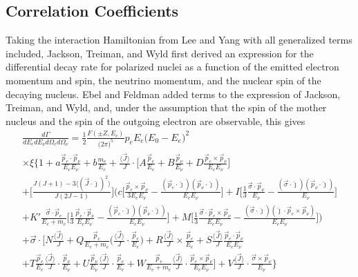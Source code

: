 \subsection{Correlation Coefficients} \label{ssec:correlations}
Taking the interaction Hamiltonian from Lee and Yang with all generalized terms included,
Jackson, Treiman, and Wyld \cite{jackson1957a,jackson1957b} first derived an expression
for the differential decay rate for polarized nuclei as a function of the emitted electron momentum
and spin, the neutrino momentum, and the nuclear spin of the decaying nucleus.
Ebel and Feldman \cite{ebel1957} added terms to the expression of Jackson, Treiman, and Wyld,
and, under the assumption that the spin of the mother nucleus and the spin of the outgoing electron
are observable, this gives
%
\begin{multline}
  \frac{d\Gamma}{dE_e dE_\nu d\Omega_e d\Omega_\nu} = \frac{1}{2} \frac{F(\pm Z, E_e)}{\big( 2\pi \big)^5}
  p_e E_e \big( E_0 - E_e \big)^2 \\ \times \xi 
  \Bigg\{ 1 + a\frac{\vec{p}_e \cdot \vec{p}_\nu}{E_e E_\nu} + b\frac{m_e}{E_e} 
  + \frac{\langle\vec{ J }\rangle}{J} \cdot \Bigg[ A\frac{\vec{p}_e}{E_e}
    + B\frac{\vec{p}_\nu}{E_\nu} + D\frac{\vec{p}_e \times \vec{p}_\nu}{E_e E_\nu}\Bigg] \\
  + \Bigg[ \frac{J(J+1)-3\langle (\vec{J} \cdot \hat{\jmath})^2 \rangle}{J(2J-1)} \Bigg]
  \Bigg( c\Bigg[ \frac{\vec{p}_e \times \vec{p}_\nu}{3E_eE_\nu} -
    \frac{(\vec{p}_e \cdot \hat{\jmath})(\vec{p}_\nu \cdot \hat{\jmath}) }{E_eE_\nu} \Bigg]
  + I \Bigg[ \frac{1}{3}\frac{\vec{\sigma} \cdot \vec{p}_\nu}{E_\nu}
    - \frac{(\vec{\sigma} \cdot \hat{\jmath})(\vec{p}_\nu \cdot \hat{\jmath})}{E_\nu} \Bigg] \\
  + K'\frac{\vec{\sigma} \cdot \vec{p}_e}{E_e+m_e} \Bigg[ \frac{1}{3}\frac{\vec{p}_e \cdot \vec{p}_\nu}{E_e E_\nu}
    - \frac{(\vec{p}_e \cdot \hat{\jmath})(\vec{p}_\nu \cdot \hat{\jmath})}{E_e E_\nu} \Bigg] 
  + M \Bigg[ \frac{1}{3}\frac{\vec{\sigma} \cdot \vec{p}_e \times \vec{p}_\nu}{E_e E_\nu}
    - \frac{(\vec{\sigma} \cdot \hat{\jmath})(\hat{\jmath} \cdot \vec{p}_e \times \vec{p}_\nu )}{E_e E_\nu} \Bigg] \Bigg) \\
  + \vec{\sigma} \cdot \Bigg[ N\frac{\langle \vec{J} \rangle}{J}
    + Q\frac{\vec{p}_e}{E_e+m_e}\Bigg(\frac{\langle \vec{J} \rangle}{J} \cdot \frac{\vec{p}_e}{E_e}\Bigg)
    + R\frac{\langle \vec{J} \rangle}{J} \times \frac{\vec{p}_e}{E_e}
    + S\frac{\langle \vec{J} \rangle}{J} \frac{\vec{p}_e\cdot \vec{p}_\nu}{E_e E_\nu} \\
    + T\frac{\vec{p}_e}{E_e}\frac{\langle \vec{J} \rangle}{J} \cdot \frac{\vec{p}_\nu}{E_\nu}
    + U\frac{\vec{p}_\nu}{E_\nu}\frac{\langle \vec{J} \rangle}{J} \cdot \frac{\vec{p}_e}{E_e}
    + W\frac{\vec{p}_e}{E_e+m_e}\frac{\langle \vec{J} \rangle}{J} \cdot \frac{\vec{p}_e \times \vec{p}_\nu}{E_e E_\nu}
    \Bigg]
  + V\frac{\langle \vec{J} \rangle}{J} \cdot \frac{\vec{\sigma} \times \vec{p}_\nu}{E_\nu}
  \Bigg\}
  \label{eq:jackson}
\end{multline}
